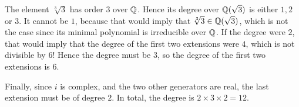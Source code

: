 \documentclass[11pt, english]{article}
\begin{document}
\begin{sol}
\begin{enumerate}
	The element $\sqrt[3]{3}$ has order $3$ over $\mathbb{Q}$. Hence its degree over $\mathbb{Q}(\sqrt 3)$ is either $1,2$ or $3$. It cannot be $1$, because that would imply that $\sqrt[3]3 \in \mathbb{Q}(\sqrt 3)$, which is not the case since its minimal polynomial is irreducible over $\mathbb{Q}$. If the degree were $2$, that would imply that the degree of the first two extensions were $4$, which is not divisible by $6$! Hence the degree must be $3$, so the degree of the first two extensions is $6$.

	Finally, since $i$ is complex, and the two other generators are real, the last extension must be of degree $2$. In total, the degree is $2 \times 3 \times 2 = 12$.
\end{enumerate}

\end{sol}
\end{document}
